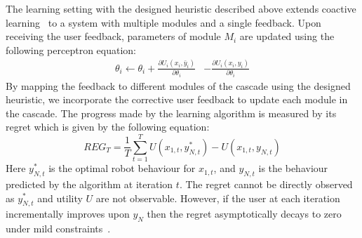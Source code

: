 The learning setting with the designed heuristic described above extends coactive learning~\citep{Jain13,Shivaswamy12} to a system with multiple modules and a single feedback. Upon receiving the user feedback, parameters of module $M_i$ are updated using the following perceptron equation:  
\begin{align}
\theta_i \leftarrow \theta_i +  \frac{\partial U_i(x_i,\bar{y}_i)}{\partial \theta_i} &- \frac{\partial U_i(x_i,{y}_i)}{\partial \theta_i}
\end{align}
By mapping the feedback to different modules of the cascade using the designed heuristic, we incorporate the corrective user feedback to update each module in the cascade. The progress made by the learning algorithm is measured by its regret which is given by the following equation:%
\begin{equation}
\label{eq:regret}
REG_T = \frac{1}{T}\sum_{t=1}^T U(x_{1,t},y_{N,t}^*) - U(x_{1,t},y_{N,t}) 
\end{equation}
Here $y_{N,t}^*$ is the optimal robot behaviour for $x_{1,t}$, and $y_{N,t}$ is the behaviour predicted by the algorithm at iteration $t$. The regret cannot be directly observed as $y_{N,t}^*$ and utility $U$ are not observable. However, if the user at each iteration incrementally improves upon $y_N$ then the regret asymptotically decays to zero under mild constraints~\citep{Shivaswamy12,Jain13}.

